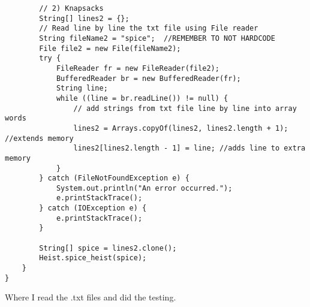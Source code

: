 \documentclass{article}
\begin{document}
\begin{lstlisting}
        // 2) Knapsacks
        String[] lines2 = {};
        // Read line by line the txt file using File reader
        String fileName2 = "spice";  //REMEMBER TO NOT HARDCODE
        File file2 = new File(fileName2);
        try {
            FileReader fr = new FileReader(file2);
            BufferedReader br = new BufferedReader(fr);
            String line;
            while ((line = br.readLine()) != null) {
                // add strings from txt file line by line into array words
                lines2 = Arrays.copyOf(lines2, lines2.length + 1); //extends memory
                lines2[lines2.length - 1] = line; //adds line to extra memory
            }
        } catch (FileNotFoundException e) {
            System.out.println("An error occurred.");
            e.printStackTrace();
        } catch (IOException e) {
            e.printStackTrace();
        }

        String[] spice = lines2.clone();
        Heist.spice_heist(spice);
    }
}
\end{lstlisting}
Where I read the .txt files and did the testing.
\end{document}
